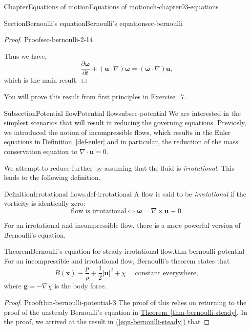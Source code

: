 \documentclass[oneside,10pt,]{book}
\newcommand{\xreffont}{\relax}
\numberwithin{equation}{section}
\newcommand{\pd}[2]{\frac{\partial#1}{\partial#2}}
\newcommand{\bx}{\boldsymbol{x}}
\newcommand{\bu}{\boldsymbol{u}}
\newcommand{\bg}{\boldsymbol{g}}
\newcommand{\bomega}{\boldsymbol{\omega}}
\begin{document}
\begin{chapterptx}{Chapter}{Equations of motion}{}{Equations of motion}{}{}{ch-chapter03-equations}
\begin{sectionptx}{Section}{Bernoulli's equation}{}{Bernoulli's equation}{}{}{sec-bernoulli}
\begin{introduction}{}
\begin{proof}{Proof}{}{sec-bernoulli-2-14}
\par
Thus we have,%
\begin{equation*}
\pd{\bomega}{t} + (\bu \cdot \nabla)\bomega = (\bomega \cdot \nabla)\bu,
\end{equation*}
which is the main result.%
\end{proof}
You will prove this result from first principles in \hyperlink{ex-vorticity-equation}{Exercise~{\xreffont 3.6.7}}.%
\end{introduction}%
%
%
\typeout{************************************************}
\typeout{************************************************}
%
\begin{subsectionptx}{Subsection}{Potential flow}{}{Potential flow}{}{}{subsec-potential}
We are interested in the simplest scenarios that will result in reducing the governing equations. Previosly, we introduced the notion of incompressible flows, which results in the Euler equations in \hyperref[def-euler]{Definition~{\xreffont\ref{def-euler}}} and in particular, the reduction of the mass conservation equation to \(\nabla \cdot \bu = 0\).%
\par
We attempt to reduce further by assuming that the fluid is \emph{irrotational}. This lends to the following definition.%
\begin{definition}{Definition}{Irrotational flows.}{def-irrotational}%
A flow is said to be \emph{irrotational} if the vorticity is identically zero:%
\begin{equation}
\textrm{flow is irrotational} \Longleftrightarrow  \bomega = \nabla \times \bu \equiv 0.\label{eqn-irrotational}
\end{equation}
%
\end{definition}
For an irrotational and incompressible flow, there is a more powerful version of Bernoulli's equation.%
\begin{theorem}{Theorem}{Bernoulli's equation for steady irrotational flow.}{}{thm-bernoulli-potential}%
For an incompressible and irrotational flow, Bernoulli's theorem states that%
\begin{equation}
B(\bx) \equiv \frac{p}{\rho} + \frac{1}{2} |\bu|^2 + \chi = \textrm{constant everywhere},\label{eqn-bernoulli-potential}
\end{equation}
where \(\bg = -\nabla \chi\) is the body force.%
\end{theorem}
\begin{proof}{Proof}{}{thm-bernoulli-potential-3}
The proof of this relies on returning to the proof of the unsteady Bernoulli's equation in \hyperref[thm-bernoulli-steady]{Theorem~{\xreffont\ref{thm-bernoulli-steady}}}. In the proof, we arrived at the result in \hyperref[eqn-bernoulli-steady]{({\xreffont\ref{eqn-bernoulli-steady}})} that%

\end{proof}
\end{subsectionptx}
\end{sectionptx}
\end{chapterptx}
\end{document}
